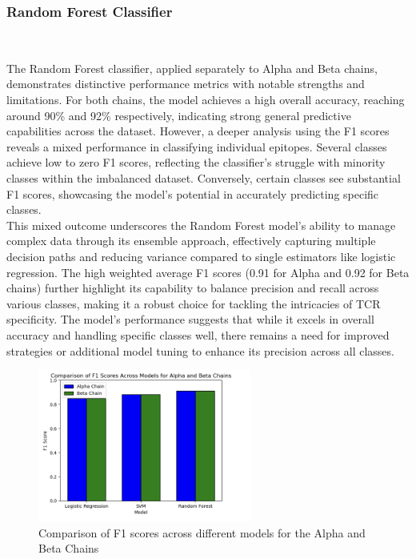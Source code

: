 \documentclass[conference]{IEEEtran}
\begin{document}
    \subsubsection{Random Forest Classifier} \
	
	The Random Forest classifier, applied separately to Alpha and Beta chains, demonstrates distinctive performance metrics with notable strengths and limitations. For both chains, the model achieves a high overall accuracy, reaching around 90\% and 92\% respectively, indicating strong general predictive capabilities across the dataset. However, a deeper analysis using the F1 scores reveals a mixed performance in classifying individual epitopes. Several classes achieve low to zero F1 scores, reflecting the classifier's struggle with minority classes within the imbalanced dataset. Conversely, certain classes see substantial F1 scores, showcasing the model's potential in accurately predicting specific classes.
    \\

    This mixed outcome underscores the Random Forest model's ability to manage complex data through its ensemble approach, effectively capturing multiple decision paths and reducing variance compared to single estimators like logistic regression. The high weighted average F1 scores (0.91 for Alpha and 0.92 for Beta chains) further highlight its capability to balance precision and recall across various classes, making it a robust choice for tackling the intricacies of TCR specificity. The model's performance suggests that while it excels in overall accuracy and handling specific classes well, there remains a need for improved strategies or additional model tuning to enhance its precision across all classes.
    \\

    \begin{figure}[h]
		    \centering
            \includegraphics[width=7cm]{fig2.png}
		    \caption{Comparison of F1 scores across different models for the Alpha and Beta Chains}
		    \end{figure}
      
\end{document}
